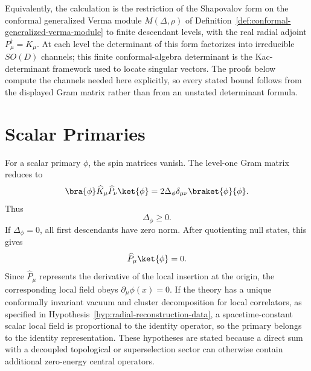 Equivalently, the calculation is the restriction of the Shapovalov form on the
conformal generalized Verma module \(M(\Delta,\rho)\) of
Definition~\ref{def:conformal-generalized-verma-module} to finite descendant
levels, with the real radial adjoint \(P_\mu^\dagger=K_\mu\).  At each level
the determinant of this form factorizes into irreducible \(SO(D)\) channels;
this finite conformal-algebra determinant is the Kac-determinant framework
used to locate singular vectors.  The proofs below compute the channels
needed here explicitly, so every stated bound follows from the displayed Gram
matrix rather than from an unstated determinant formula.

\section{Scalar Primaries}

For a scalar primary \(\phi\), the spin matrices vanish.  The level-one Gram
matrix reduces to
\[
  \bra{\phi}\widehat K_\mu\widehat P_\nu\ket{\phi}
  =
  2\Delta_\phi\delta_{\mu\nu}\braket{\phi}{\phi}.
\]
Thus
\[
  \Delta_\phi\ge0.
\]
If \(\Delta_\phi=0\), all first descendants have zero norm.  After quotienting
null states, this gives
\[
  \widehat P_\mu\ket{\phi}=0.
\]
Since \(\widehat P_\mu\) represents the derivative of the local insertion at the
origin, the corresponding local field obeys \(\partial_\mu\phi(x)=0\).  If the
theory has a unique conformally invariant vacuum and cluster decomposition
for local correlators, as specified in
Hypothesis~\ref{hyp:radial-reconstruction-data}, a spacetime-constant scalar
local field is proportional to the identity operator, so the primary belongs to
the identity representation.  These hypotheses are stated because a direct sum
with a decoupled topological or superselection sector can otherwise contain
additional zero-energy central operators.

